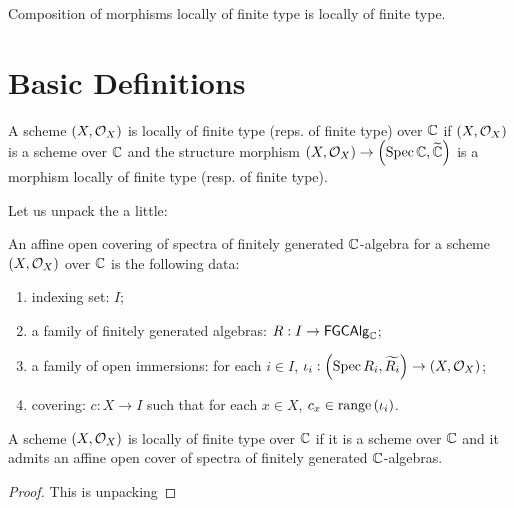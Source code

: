 \begin{proposition}\label{thm:locally_of_finite_type_comp}
  Composition of morphisms locally of finite type is locally of finite type.
\end{proposition}

\section{Basic Definitions}

\begin{definition}\label{def:SchemeLocallyOfFiniteType}
  A scheme $\left(X, \mathcal{O}_{X}\right)$ is locally of finite type (reps. of finite type) over $\mathbb{C}$ if $\left(X, \mathcal{O}_{X}\right)$ is a scheme over $\mathbb{C}$ and the structure morphism $\left(X, \mathcal{O}_{X}\right) \to \left(\operatorname*{Spec}{\mathbb{C}}, \widetilde{\mathbb{C}}\right)$ is a morphism locally of finite type (resp. of finite type). 
\end{definition}

Let us unpack the  a little:


\begin{definition}
  An affine open covering of spectra of finitely generated $\mathbb{C}$-algebra for a scheme $\left(X, \mathcal{O}_{X}\right)$ over $\mathbb{C}$ is the following data:
    \begin{enumerate}
        \item indexing set: $I$;
        \item a family of finitely generated algebras: $R : I \to \mathsf{FGCAlg}_{\mathbb{C}}$;
        \item a family of open immersions: for each $i \in I$, $\iota_i: \left(\operatorname*{Spec}{R_i}, \widetilde{R_i}\right) \to \left(X, \mathcal{O}_{X}\right)$;
        \item covering: $c : X \to I$ such that for each $x \in X$, $c_x \in \operatorname*{range}\left({\iota_i}\right)$.
    \end{enumerate}
\end{definition}

\begin{lemma}
    A scheme $\left(X, \mathcal{O}_{X}\right)$ is locally of finite type over $\mathbb{C}$ if it is a scheme over $\mathbb{C}$ and it admits an affine open cover of spectra of finitely generated $\mathbb{C}$-algebras.
\end{lemma}

\begin{proof}
    This is unpacking 
\end{proof}

